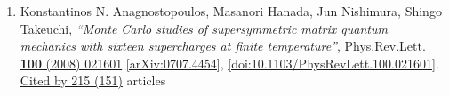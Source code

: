 \documentclass[a4paper,10pt]{article}
\begin{document}
\begin{enumerate}
\begin{enumerate}
\end{enumerate}
\item Konstantinos N. Anagnostopoulos, Masanori Hanada, Jun Nishimura, Shingo Takeuchi, {\it ``Monte Carlo studies of supersymmetric matrix quantum mechanics with sixteen supercharges at finite temperature''}, \href{https://www.doi.org/10.1103/PhysRevLett.100.021601}{Phys.Rev.Lett. {\bf 100} (2008) 021601} \href{https://arxiv.org/abs/0707.4454}{[arXiv:0707.4454]}, \href{https://www.doi.org/10.1103/PhysRevLett.100.021601}{[doi:10.1103/PhysRevLett.100.021601]}.
\\\href{https://inspirehep.net/literature/?q=refersto%3Arecid%3A756942}{Cited by 215 (151)} articles


\end{enumerate}
\end{document}
